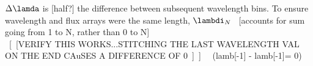 $\Delta\lamda$ is [half?] the difference between subsequent wavelength bins.  To ensure wavelength and flux arrays were the same length, $\lambdi_{N}$
~[accounts for sum going from 1 to N, rather than 0 to N]\\
~[~[VERIFY THIS WORKS...STITCHING THE LAST WAVELENGTH VAL ON THE END CAuSES A DIFFERENCE OF 0~]~] ~~(lamb[-1] - lamb[-1]= 0)\\
